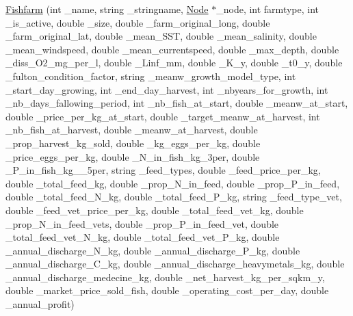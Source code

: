 \begin{DoxyCompactItemize}
\mbox{\hyperlink{class_fishfarm_ad100e70f8cb1ede17288e2b929215b90}{Fishfarm}} (int \+\_\+name, string \+\_\+stringname, \mbox{\hyperlink{class_node}{Node}} $\ast$\+\_\+node, int farmtype, int \+\_\+is\+\_\+active, double \+\_\+size, double \+\_\+farm\+\_\+original\+\_\+long, double \+\_\+farm\+\_\+original\+\_\+lat, double \+\_\+mean\+\_\+\+S\+ST, double \+\_\+mean\+\_\+salinity, double \+\_\+mean\+\_\+windspeed, double \+\_\+mean\+\_\+currentspeed, double \+\_\+max\+\_\+depth, double \+\_\+diss\+\_\+\+O2\+\_\+mg\+\_\+per\+\_\+l, double \+\_\+\+Linf\+\_\+mm, double \+\_\+\+K\+\_\+y, double \+\_\+t0\+\_\+y, double \+\_\+fulton\+\_\+condition\+\_\+factor, string \+\_\+meanw\+\_\+growth\+\_\+model\+\_\+type, int \+\_\+start\+\_\+day\+\_\+growing, int \+\_\+end\+\_\+day\+\_\+harvest, int \+\_\+nbyears\+\_\+for\+\_\+growth, int \+\_\+nb\+\_\+days\+\_\+fallowing\+\_\+period, int \+\_\+nb\+\_\+fish\+\_\+at\+\_\+start, double \+\_\+meanw\+\_\+at\+\_\+start, double \+\_\+price\+\_\+per\+\_\+kg\+\_\+at\+\_\+start, double \+\_\+target\+\_\+meanw\+\_\+at\+\_\+harvest, int \+\_\+nb\+\_\+fish\+\_\+at\+\_\+harvest, double \+\_\+meanw\+\_\+at\+\_\+harvest, double \+\_\+prop\+\_\+harvest\+\_\+kg\+\_\+sold, double \+\_\+kg\+\_\+eggs\+\_\+per\+\_\+kg, double \+\_\+price\+\_\+eggs\+\_\+per\+\_\+kg, double \+\_\+\+N\+\_\+in\+\_\+fish\+\_\+kg\+\_\+3per, double \+\_\+\+P\+\_\+in\+\_\+fish\+\_\+kg\+\_\+\_\+5per, string \+\_\+feed\+\_\+types, double \+\_\+feed\+\_\+price\+\_\+per\+\_\+kg, double \+\_\+total\+\_\+feed\+\_\+kg, double \+\_\+prop\+\_\+\+N\+\_\+in\+\_\+feed, double \+\_\+prop\+\_\+\+P\+\_\+in\+\_\+feed, double \+\_\+total\+\_\+feed\+\_\+\+N\+\_\+kg, double \+\_\+total\+\_\+feed\+\_\+\+P\+\_\+kg, string \+\_\+feed\+\_\+type\+\_\+vet, double \+\_\+feed\+\_\+vet\+\_\+price\+\_\+per\+\_\+kg, double \+\_\+total\+\_\+feed\+\_\+vet\+\_\+kg, double \+\_\+prop\+\_\+\+N\+\_\+in\+\_\+feed\+\_\+vets, double \+\_\+prop\+\_\+\+P\+\_\+in\+\_\+feed\+\_\+vet, double \+\_\+total\+\_\+feed\+\_\+vet\+\_\+\+N\+\_\+kg, double \+\_\+total\+\_\+feed\+\_\+vet\+\_\+\+P\+\_\+kg, double \+\_\+annual\+\_\+discharge\+\_\+\+N\+\_\+kg, double \+\_\+annual\+\_\+discharge\+\_\+\+P\+\_\+kg, double \+\_\+annual\+\_\+discharge\+\_\+\+C\+\_\+kg, double \+\_\+annual\+\_\+discharge\+\_\+heavymetals\+\_\+kg, double \+\_\+annual\+\_\+discharge\+\_\+medecine\+\_\+kg, double \+\_\+net\+\_\+harvest\+\_\+kg\+\_\+per\+\_\+sqkm\+\_\+y, double \+\_\+market\+\_\+price\+\_\+sold\+\_\+fish, double \+\_\+operating\+\_\+cost\+\_\+per\+\_\+day, double \+\_\+annual\+\_\+profit)
\item 

\end{DoxyCompactItemize}
